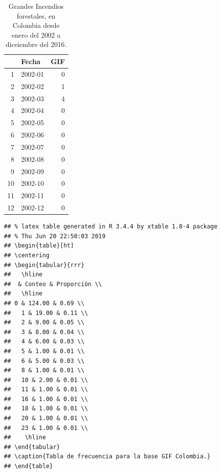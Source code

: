 \documentclass[a4paper]{article}\usepackage[]{graphicx}\usepackage[]{color}
\makeatletter
\newenvironment{kframe}{%
 \def\at@end@of@kframe{}%
 \ifinner\ifhmode%
  \def\at@end@of@kframe{\end{minipage}}%
  \begin{minipage}{\columnwidth}%
 \fi\fi%
 \def\FrameCommand##1{\hskip\@totalleftmargin \hskip-\fboxsep
 \colorbox{shadecolor}{##1}\hskip-\fboxsep
     \hskip-\linewidth \hskip-\@totalleftmargin \hskip\columnwidth}%
 \MakeFramed {\advance\hsize-\width
   \@totalleftmargin\z@ \linewidth\hsize
   \@setminipage}}%
 {\par\unskip\endMakeFramed%
 \at@end@of@kframe}
\newenvironment{knitrout}{}{} %
\makeatother
\begin{document}
\begin{table}[ht]
\centering
\begin{tabular}{rlr}
  \hline
 & Fecha & GIF \\ 
  \hline
1 & 2002-01 &   0 \\ 
  2 & 2002-02 &   1 \\ 
  3 & 2002-03 &   4 \\ 
  4 & 2002-04 &   0 \\ 
  5 & 2002-05 &   0 \\ 
  6 & 2002-06 &   0 \\ 
  7 & 2002-07 &   0 \\ 
  8 & 2002-08 &   0 \\ 
  9 & 2002-09 &   0 \\ 
  10 & 2002-10 &   0 \\ 
  11 & 2002-11 &   0 \\ 
  12 & 2002-12 &   0 \\ 
   \hline
\end{tabular}
\caption{Grandes Incendios forestales, en Colombia desde enero del 2002 a diceiembre del 2016.} 
\end{table}


\begin{knitrout}
\color{fgcolor}\begin{kframe}
\begin{verbatim}
## % latex table generated in R 3.4.4 by xtable 1.8-4 package
## % Thu Jun 20 22:50:03 2019
## \begin{table}[ht]
## \centering
## \begin{tabular}{rrr}
##   \hline
##  & Conteo & Proporción \\ 
##   \hline
## 0 & 124.00 & 0.69 \\ 
##   1 & 19.00 & 0.11 \\ 
##   2 & 9.00 & 0.05 \\ 
##   3 & 8.00 & 0.04 \\ 
##   4 & 6.00 & 0.03 \\ 
##   5 & 1.00 & 0.01 \\ 
##   6 & 5.00 & 0.03 \\ 
##   8 & 1.00 & 0.01 \\ 
##   10 & 2.00 & 0.01 \\ 
##   11 & 1.00 & 0.01 \\ 
##   16 & 1.00 & 0.01 \\ 
##   18 & 1.00 & 0.01 \\ 
##   20 & 1.00 & 0.01 \\ 
##   23 & 1.00 & 0.01 \\ 
##    \hline
## \end{tabular}
## \caption{Tabla de frecuencia para la base GIF Colombia.} 
## \end{table}
\end{verbatim}
\end{kframe}
\end{knitrout}
\end{document}
